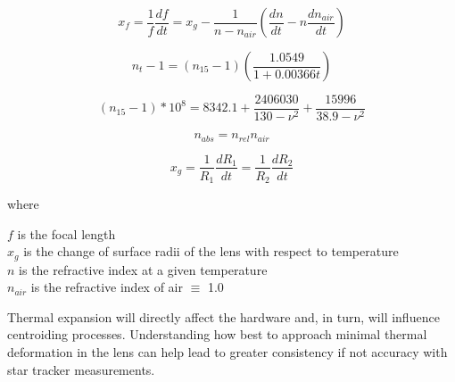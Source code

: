 \begin{equation} \label{temp_and_focal_length_eq}
    x_f = \frac{1}{f} \frac{df}{dt} = x_g - \frac{1}{n - n_{air}} \left( \frac{dn}{dt} - n \frac{dn_{air}}{dt} \right)
\end{equation}

\begin{equation} \label{n_at_temp}
    n_t - 1 = (n_{15} - 1)\left(\frac{1.0549}{1 + 0.00366t}\right)
\end{equation}

\begin{equation} \label{n_at_15}
    (n_{15} - 1) * 10^8 = 8342.1 + \frac{2406030}{130 - \nu^2} + \frac{15996}{38.9-\nu^2}
\end{equation}

\begin{equation}
    n_{abs} = n_{rel}n_{air}
\end{equation}

\begin{equation}
    x_g = \frac{1}{R_1} \frac{dR_1}{dt} = \frac{1}{R_2} \frac{dR_2}{dt}
\end{equation}

where 
\begin{center}
    $f$ is the focal length \\
    $x_g$ is the change of surface radii of the lens with respect to temperature \\
    $n$ is the refractive index at a given temperature \\
    $n_{air}$ is the refractive index of air $\equiv$ 1.0
\end{center}

\par \qquad Thermal expansion will directly affect the hardware and, in turn, will influence centroiding processes.
Understanding how best to approach minimal thermal deformation in the lens can help lead to greater consistency if not accuracy with star tracker measurements.